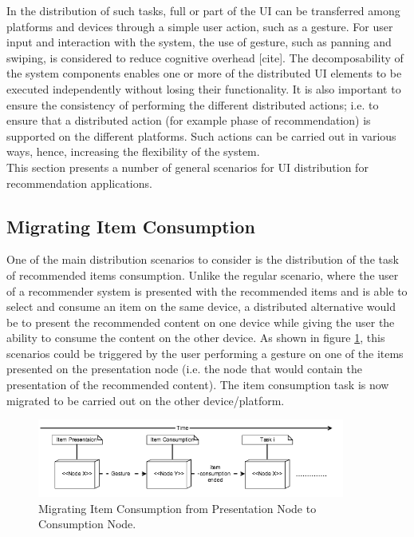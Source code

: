 In the distribution of such tasks, full or part of the UI can be transferred among platforms and devices through a simple user action, such as a gesture. For user input and interaction with the system, the use of gesture, such as panning and swiping, is considered to reduce cognitive overhead [cite]. The decomposability of the system components enables one or more of the distributed UI elements to be executed independently without losing their functionality. It is also important to ensure the consistency of performing the different distributed actions; i.e. to ensure that a distributed action (for example phase of recommendation) is supported on the different platforms. Such actions can be carried out in various ways, hence, increasing the flexibility of the system. \\

This section presents a number of general scenarios for UI distribution for recommendation applications.

\subsection{Migrating Item Consumption}
One of the main distribution scenarios to consider is the distribution of the task of recommended items consumption. Unlike the regular scenario, where the user of a recommender system is presented with the recommended items and is able to select and consume an item on the same device, a distributed alternative would be to present the recommended content on one device while giving the user the ability to consume the content on the other device. As shown in figure \ref{fig:figure31}, this scenarios could be triggered by the user performing a gesture on one of the items presented on the presentation node (i.e. the node that would contain the presentation of the recommended content). The item consumption task is now migrated to be carried out on the other device/platform. 
\begin{figure}[h]
\includegraphics[width=0.9\textwidth, inner, center]{generic1}
\caption{Migrating Item Consumption from Presentation Node to Consumption Node.}
\label{fig:figure31}
\end{figure}

